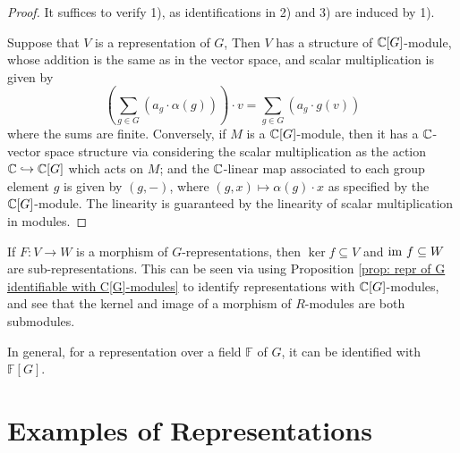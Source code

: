 \begin{proof}
    It suffices to verify 1), as identifications in 2) and 3) are induced by 1). 
    
    Suppose that $V$ is a representation of $G$, Then $V$ has a structure of $\mathbb{C}[G]$-module, whose addition is the same as in the vector space, and scalar multiplication is given by
    \[
        \left( \sum_{g \in G} (a_g \cdot \alpha(g)) \right) \cdot v = \sum_{g \in G} (a_g \cdot g(v))
    \]
    where the sums are finite. Conversely, if $M$ is a $\mathbb{C}[G]$-module, then it has a $\mathbb{C}$-vector space structure via considering the scalar multiplication as the action $\mathbb{C} \hookrightarrow \mathbb{C}[G]$ which acts on $M$; and the $\mathbb{C}$-linear map associated to each group element $g$ is given by $(g, -)$, where $(g, x) \mapsto \alpha(g) \cdot x$ as specified by the $\mathbb{C}[G]$-module. The linearity is guaranteed by the linearity of scalar multiplication in modules.
\end{proof}

\begin{corollary}\label{cor: kernel and image of morphism of repr. is repr.}
    If $F: V \to W$ is a morphism of $G$-representations, then $\ker f \subseteq V$ and $\mathrm{im}\  f \subseteq W$ are sub-representations. This can be seen via using Proposition \ref{prop: repr of G identifiable with C[G]-modules} to identify representations with $\mathbb{C}[G]$-modules, and see that the kernel and image of a morphism of $R$-modules are both submodules. 
\end{corollary}

\begin{remark}
    In general, for a representation over a field $\mathbb{F}$ of $G$, it can be identified with $\mathbb{F}[G]$.
\end{remark}

\section{Examples of Representations}

